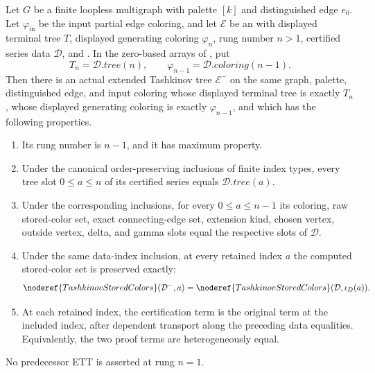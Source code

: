 \begin{lemma}
Let $G$ be a finite loopless multigraph with palette $[k]$ and
distinguished edge $e_0$.  Let $\varphi_{\mathrm{in}}$ be the input
partial edge coloring, and let $\mathcal E$ be an
 with displayed terminal tree $T$,
displayed generating coloring $\varphi_n$, rung number $n>1$, certified
series data $\mathcal D$, and .  In the
zero-based arrays of , put
\[
 T_n=\mathcal D.\mathit{tree}(n),\qquad
 \varphi_{n-1}=\mathcal D.\mathit{coloring}(n-1).
\]
Then there is an actual extended Tashkinov tree $\mathcal E^-$ on the
same graph, palette, distinguished edge, and input coloring whose
displayed terminal tree is exactly $T_n$, whose displayed generating
coloring is exactly $\varphi_{n-1}$, and which has the following
properties.
\begin{enumerate}
\item Its rung number is $n-1$, and it has maximum property.
\item Under the canonical order-preserving inclusions of finite index
types, every tree slot $0\leq a\leq n$ of its certified series equals
$\mathcal D.\mathit{tree}(a)$.
\item Under the corresponding inclusions, for every $0\leq a\leq n-1$
its coloring, raw stored-color set, exact connecting-edge set, extension
kind, chosen vertex, outside vertex, delta, and gamma slots equal the
respective slots of $\mathcal D$.
\item Under the same data-index inclusion, at every retained index $a$
the computed stored-color set is preserved exactly:
\[
 \noderef{TashkinovStoredColors}(\mathcal D^-,a)
 =\noderef{TashkinovStoredColors}(\mathcal D,\iota_D(a)).
\]
\item At each retained index, the
 certification term is the original term at
the included index, after dependent transport along the preceding data
equalities.  Equivalently, the two proof terms are heterogeneously equal.
\end{enumerate}
No predecessor ETT is asserted at rung $n=1$.
\end{lemma}
